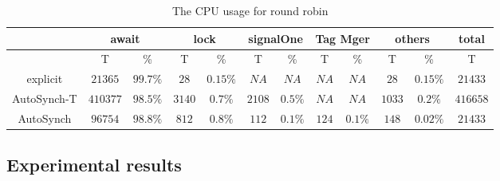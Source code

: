 \documentclass[preprint]{sigplanconf}
\begin{document}
\begin{table}[ht!]
   \centering
   \begin{tabular}{|c||c|c||c|c||c|c||c|c|c|c|c|}
      \hline 
      & \multicolumn{2}{c||}{await} & \multicolumn{2}{c||}{lock} & 
        \multicolumn{2}{c||}{signalOne} & \multicolumn{2}{c|}{Tag Mger} &
        \multicolumn{2}{c|}{others} & total \\
      \hline
         & T & \% & T & \% & T & \% & T & \% & T & \% & T \\
      \hline 
      \hline 
      explicit & $21365$ & $99.7\%$ & $28$ & $0.15\%$ & $NA$ & $NA$ & $NA$ &
      $NA$  & $28$ & $0.15\%$ & $21433$ \\
      \hline 
      AutoSynch-T & $410377$ & $98.5\%$ & $3140$ & $0.7\%$ & $2108$ & $0.5\%$
      & $NA$ & $NA$ & $1033$ & $0.2\%$ & $416658$\\
      \hline 
      AutoSynch & $96754$ & $98.8\%$ & $812$ & $0.8\%$ & $112$ & $0.1\%$ & 
      $124$ & $0.1\%$ & $148$ & $0.02\%$ & $21433$\\
      \hline 
   \end{tabular}
   \caption{The CPU usage for round robin}
   \label{tab:cpu}
\end{table}


%
\subsection{Experimental results}
\end{document}

